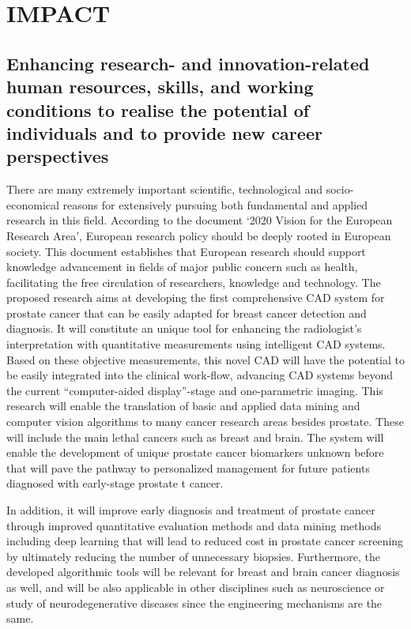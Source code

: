 \section{IMPACT}
\label{sec:impact}

\subsection{Enhancing research- and innovation-related human resources, skills, and working conditions to realise the potential of individuals and to provide new career perspectives}
\label{sec:enhancement}

There are many extremely important  scientific, technological and socio-economical reasons for extensively pursuing  both fundamental and applied research in this field.  According to the document ‘2020 Vision for the European Research Area’, European research policy should be deeply rooted in European society. This document establishes that European research should support knowledge advancement in fields of major public concern such as health, facilitating the free circulation of researchers, knowledge and technology. The proposed research aims at developing  the first comprehensive CAD system for prostate cancer that can be easily adapted for breast cancer detection and diagnosis.  It will constitute an unique tool for enhancing the radiologist’s interpretation with quantitative measurements using intelligent CAD systems. Based on these objective measurements,  this novel CAD will have the potential to be easily integrated into the clinical work-flow, advancing CAD systems beyond the current “computer-aided display”-stage and one-parametric imaging. This research will enable the translation of  basic and applied data mining and computer vision algorithms to many cancer research areas besides prostate. These will include the main lethal cancers such as breast and brain. The system will enable the development of unique prostate cancer biomarkers unknown before that will pave the pathway to personalized management for future patients diagnosed with early-stage prostate t cancer.

In addition, it will improve early diagnosis and treatment of prostate cancer through improved quantitative evaluation methods  and data mining methods including deep learning that will lead to reduced cost in prostate cancer screening by ultimately reducing the number of unnecessary biopsies. Furthermore, the developed algorithmic tools will be relevant  for breast and brain cancer diagnosis as well, and will be also applicable in other disciplines such as neuroscience or study of neurodegenerative diseases since the engineering mechanisms are the same.

